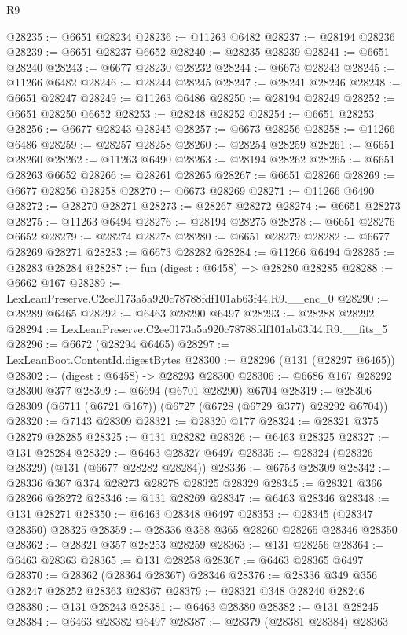\begin{lexlean}{R9}
\begin{coremodule}
@28235 := @6651 @28234
@28236 := @11263 @6482
@28237 := @28194 @28236
@28239 := @6651 @28237 @6652
@28240 := @28235 @28239
@28241 := @6651 @28240
@28243 := @6677 @28230 @28232
@28244 := @6673 @28243
@28245 := @11266 @6482
@28246 := @28244 @28245
@28247 := @28241 @28246
@28248 := @6651 @28247
@28249 := @11263 @6486
@28250 := @28194 @28249
@28252 := @6651 @28250 @6652
@28253 := @28248 @28252
@28254 := @6651 @28253
@28256 := @6677 @28243 @28245
@28257 := @6673 @28256
@28258 := @11266 @6486
@28259 := @28257 @28258
@28260 := @28254 @28259
@28261 := @6651 @28260
@28262 := @11263 @6490
@28263 := @28194 @28262
@28265 := @6651 @28263 @6652
@28266 := @28261 @28265
@28267 := @6651 @28266
@28269 := @6677 @28256 @28258
@28270 := @6673 @28269
@28271 := @11266 @6490
@28272 := @28270 @28271
@28273 := @28267 @28272
@28274 := @6651 @28273
@28275 := @11263 @6494
@28276 := @28194 @28275
@28278 := @6651 @28276 @6652
@28279 := @28274 @28278
@28280 := @6651 @28279
@28282 := @6677 @28269 @28271
@28283 := @6673 @28282
@28284 := @11266 @6494
@28285 := @28283 @28284
@28287 := fun (digest : @6458) => @28280 @28285
@28288 := @6662 @167
@28289 := LexLeanPreserve.C2ee0173a5a920c78788fdf101ab63f44.R9.__enc_0
@28290 := @28289 @6465
@28292 := @6463 @28290 @6497
@28293 := @28288 @28292
@28294 := LexLeanPreserve.C2ee0173a5a920c78788fdf101ab63f44.R9.__fits_5
@28296 := @6672 (@28294 @6465)
@28297 := LexLeanBoot.ContentId.digestBytes
@28300 := @28296 (@131 (@28297 @6465))
@28302 := (digest : @6458) -> @28293 @28300
@28306 := @6686 @167 @28292 @28300 @377
@28309 := @6694 (@6701 @28290) @6704
@28319 := @28306 @28309 (@6711 (@6721 @167)) (@6727 (@6728 (@6729 @377) @28292 @6704))
@28320 := @7143 @28309
@28321 := @28320 @177
@28324 := @28321 @375 @28279 @28285
@28325 := @131 @28282
@28326 := @6463 @28325
@28327 := @131 @28284
@28329 := @6463 @28327 @6497
@28335 := @28324 (@28326 @28329) (@131 (@6677 @28282 @28284))
@28336 := @6753 @28309
@28342 := @28336 @367 @374 @28273 @28278 @28325 @28329
@28345 := @28321 @366 @28266 @28272
@28346 := @131 @28269
@28347 := @6463 @28346
@28348 := @131 @28271
@28350 := @6463 @28348 @6497
@28353 := @28345 (@28347 @28350) @28325
@28359 := @28336 @358 @365 @28260 @28265 @28346 @28350
@28362 := @28321 @357 @28253 @28259
@28363 := @131 @28256
@28364 := @6463 @28363
@28365 := @131 @28258
@28367 := @6463 @28365 @6497
@28370 := @28362 (@28364 @28367) @28346
@28376 := @28336 @349 @356 @28247 @28252 @28363 @28367
@28379 := @28321 @348 @28240 @28246
@28380 := @131 @28243
@28381 := @6463 @28380
@28382 := @131 @28245
@28384 := @6463 @28382 @6497
@28387 := @28379 (@28381 @28384) @28363

\end{coremodule}
\end{lexlean}
